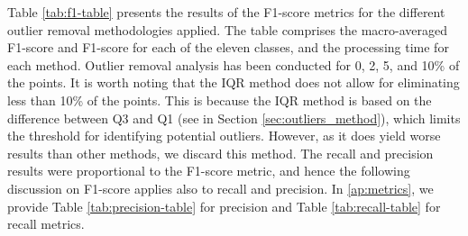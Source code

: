 \documentclass{ws-ijitdm}
\begin{document}
Table \ref{tab:f1-table} presents the results of the F1-score metrics for the different outlier removal methodologies applied. The table comprises the macro-averaged F1-score and F1-score for each of the eleven classes, and the processing time for each method. Outlier removal analysis has been conducted for 0, 2, 5, and 10\% of the points. It is worth noting that the IQR method does not allow for eliminating less than 10\% of the points. This is because the IQR method is based on the difference between Q3 and Q1 (see in Section \ref{sec:outliers_method}), which limits the threshold for identifying potential outliers. However, as it does yield worse results than other methods, we discard this method. The recall and precision results were proportional to the F1-score metric, and hence the following discussion on F1-score applies also to recall and precision. In \ref{ap:metrics}, we provide Table \ref{tab:precision-table} for precision and Table \ref{tab:recall-table} for recall metrics.
\end{document}
